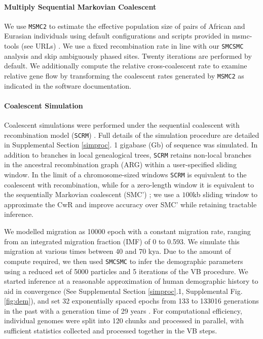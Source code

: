 \documentclass{article}
\begin{document}
\paragraph{Multiply Sequential Markovian Coalescent} We use {\tt MSMC2} to estimate the effective population size of pairs of African and Eurasian individuals using default configurations and scripts provided in msmc-tools (see URLs) \cite{Schiffels2014, Wang2019a}. We use a fixed recombination rate in line with our {\tt SMCSMC} analysis and skip ambiguously phased sites. Twenty iterations are performed by default. We additionally compute the relative cross-coalescent rate to examine relative gene flow by transforming the coalescent rates generated by {\tt MSMC2} as indicated in the software documentation.

\paragraph{Coalescent Simulation} Coalescent simulations were performed under the sequential coalescent with recombination model ({\tt SCRM}) \cite{Staab2015}. Full details of the simulation procedure are detailed in Supplemental Section \ref{simproc}. 1 gigabase (Gb) of sequence was simulated.  In addition to branches in local genealogical trees, {\tt SCRM} retains non-local branches in the ancestral recombination graph (ARG) within a user-specified sliding window.  In the limit of a chromosome-sized windows {\tt SCRM} is equivalent to the coalescent with recombination, while for a zero-length window it is equivalent to the sequentially Markovian coalescent (SMC') \cite{McVean2005,Marjoram2006}; we use a $100$kb sliding window to approximate the CwR and improve accuracy over SMC' while retaining tractable inference.

We modelled migration as 10000 epoch with a constant migration rate, ranging from an integrated migration fraction (IMF) of 0 to 0.593. We simulate this migration at various times between 40 and 70 kya.  Due to the amount of compute required, we then used {\tt SMCSMC} to infer the demographic parameters using a reduced set of 5000 particles and 5 iterations of the VB procedure. We started inference at a reasonable approximation of human demographic history to aid in convergence (See Supplemental Section \ref{simproc}.1, Supplemental Fig. \ref{fig:dem}), and set 32 exponentially spaced epochs from 133 to 133016 generations in the past with a generation time of 29 years \cite{Fenner2005}.  For computational efficiency, individual genomes were split into 120 chunks and processed in parallel, with sufficient statistics collected and processed together in the VB steps.
\end{document}
